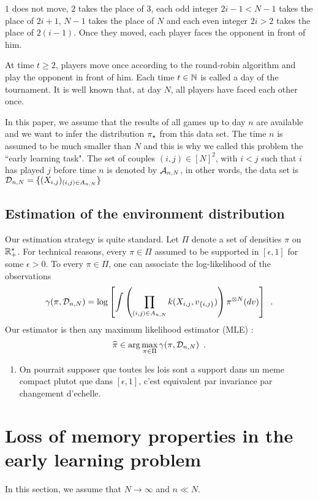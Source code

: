 $1$ does not move, $2$ takes the place of $3$, each odd integer $2i-1<N-1$ takes the place of $2i+1$, $N-1$ takes the place of $N$ and each even integer $2i>2$ takes the place of $2(i-1)$. Once they moved, each player faces the opponent in front of him.

At time $t\ge 2$, players move once according to the round-robin algorithm and play the opponent in front of him. Each time $t\in\mathbb{N}$ is called a day of the tournament. It is well known that, at day $N$, all players have faced each other once. 

In this paper, we assume that the results of all games up to day $n$ are available and we want to infer the distribution $\pi_{\star}$ from this data set. The time $n$ is assumed to be much smaller than $N$ and this is why we called this problem the ``early learning task". The set of couples $(i,j)\in[N]^2$, with $i<j$ such that $i$ has played $j$ before time $n$ is denoted by $\mathcal{A}_{n,N}$, in other words, the data set is $\mathcal{D}_{n,N}=\{(X_{i,j})_{(i,j)\in A_{n,N}}\}$


\subsection{Estimation of the environment distribution}
Our estimation strategy is quite standard. Let $\Pi$ denote a set of densities $\pi$ on $\mathbb{R}_+^*$. For technical reasons, every $\pi\in\Pi$ assumed to be supported in $[\epsilon,1]$ for some $\epsilon>0$. To every $\pi\in\Pi$, one can associate the log-likelihood of the observations
\[
\gamma(\pi,\mathcal{D}_{n,N})=\log\left[\int  \left(\prod_{(i,j)\in A_{n,N}}k(X_{i,j},v_{\{i,j\}})\right)\pi^{\otimes N}(dv)\right]\enspace.
\]
Our estimator is then any maximum likelihood estimator (MLE) :
\[
\widehat{\pi}\in \arg\max_{\pi\in\Pi}\gamma(\pi,\mathcal{D}_{n,N})\enspace.
\]


\begin{enumerate}
\item On pourrait supposer que toutes les lois sont a support dans un meme compact plutot que dans $[\epsilon,1]$, c'est equivalent par invariance par changement d'echelle.
\end{enumerate}

\section{Loss of memory properties in the early learning problem}

In this section, we assume that $N\to\infty$ and $n\ll N$.

